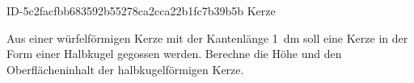 \begin{exercise}
      {ID-5c2facfbb683592b55278ca2cca22b1fc7b39b5b}
      {Kerze}
  \ifproblem\problem\par
    Aus einer würfelförmigen Kerze mit der Kantenlänge
    \SI{1}{\deci\metre}
    soll eine Kerze in der Form einer Halbkugel
    gegossen werden. Berechne die Höhe und den
    Oberflächeninhalt der halbkugelförmigen Kerze.
  \fi
\end{exercise}
